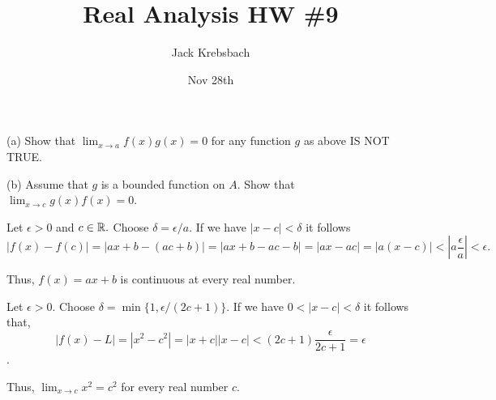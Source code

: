 \documentclass{report}
\title{Real Analysis HW \#9}
\author{Jack Krebsbach }
\date{Nov 28th}
\begin{document}
\maketitle


(a) Show that $\lim _{x \rightarrow a} f(x) g(x)=0$ for any function $g$ as above IS NOT TRUE.

\bigskip

(b) Assume that $g$ is a bounded function on $A$. Show that $\lim _{x \rightarrow c} g(x) f(x)=0$.


\begin{myproof}
    Let $\epsilon >0$ and $c \in \RR.$ Choose $\delta = \epsilon/a.$ If we have $ |x-c|< \delta$ it follows $$ |f(x) - f(c)| = |ax +b - (ac+b)| = | ax + b -ac - b | = |ax -ac| = |a(x-c)| < |a \frac{\epsilon}{a} | < \epsilon.$$

Thus, $f(x)=a x+b$ is continuous at every real number.
\end{myproof}


\begin{myproof}
  Let $\epsilon > 0.$ Choose $\delta = \min\{1, \epsilon/(2c+1)\}$. If we have $0 < |x-c| < \delta$ it follows that, $$|f(x) - L| = |x^2 - c^2| = |x + c||x-c| < (2c+1)\frac{\epsilon}{2c+1} = \epsilon$$.

Thus, $\lim _{x \rightarrow c} x^2=c^2$ for every real number $c$.
\end{myproof}

\pagebreak
{}
\bigskip
\sol
\end{document}
